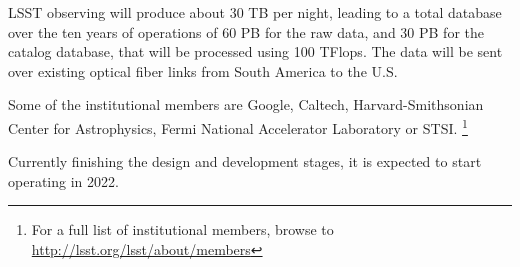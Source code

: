 LSST observing will produce about 30 TB per night, leading to a total database over the ten years of operations of 60 PB for the raw data, and 30 PB for the catalog database, that will be processed using 100 TFlops. The data will be sent over existing optical fiber links from South America to the U.S. \newline

Some of the institutional members are Google, Caltech, Harvard-Smithsonian Center for Astrophysics, Fermi National Accelerator Laboratory or STSI. \footnote{For a full list of institutional members, browse to \url{http://lsst.org/lsst/about/members}}  \newline

Currently finishing the design and development stages, it is expected to start operating in 2022.